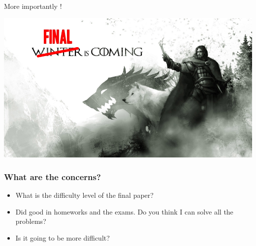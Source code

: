 \documentclass{beamer}\usepackage[]{graphicx}\usepackage[]{color}
\begin{document}
\begin{frame}{More importantly !}

\includegraphics[width=\textwidth,keepaspectratio]{final.png} 

\pause 
\begin{center}
\color[rgb]{1,0,0}{\bf Compare Midterm and Finals}
\end{center}

\end{frame}



\begin{frame}

\frametitle{What are the concerns?} 

\begin{itemize}

\item What is the difficulty level of the final paper? 

\item Did good in homeworks and the exams. Do you think I can solve all the problems? 

\item Is it going to be more difficult? 

\end{itemize}

\end{frame}
\end{document}
